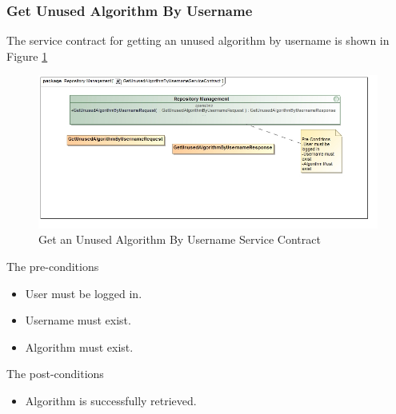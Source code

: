 \subsubsection{Get Unused Algorithm By Username}
The service contract for getting an unused algorithm by username is shown in Figure \ref{fig:getUnusedAlgorithmByUsername}
\begin{figure}[H]
	\begin{center}
		\includegraphics[scale=0.6]{../Diagrams and Charts/Test Data/GetUnusedAlgorithmByUsernameServiceContract.jpg}
		\caption{Get an Unused Algorithm By Username Service Contract}
		\label{fig:getUnusedAlgorithmByUsername}
	\end{center}
	
\end{figure}	

The pre-conditions
\begin{itemize}
	\item User must be logged in.
	\item Username must exist.
	\item Algorithm must exist.
\end{itemize}

The post-conditions
\begin{itemize}
	\item Algorithm is successfully retrieved.
\end{itemize}






